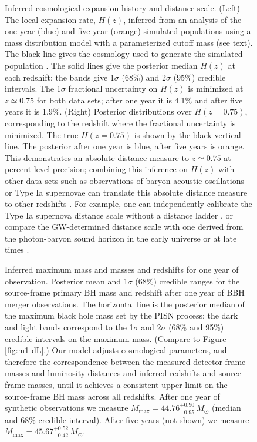 \documentclass[modern]{aastex62}
\newcommand{\MMax}{M_\mathrm{max}}
\newcommand{\MMaxOneYear}{44.76^{+0.90}_{-0.95} \, \MSun{}}
\newcommand{\MMaxFiveYear}{45.67^{+0.52}_{-0.42} \, \MSun{}}
\newcommand{\SigmaHPvtOneYear}{4.1\%}
\newcommand{\SigmaHPvtFiveYear}{1.9\%}
\newcommand{\zpivot}{0.75}
\newcommand{\MSun}{M_\odot}
\begin{document}
\begin{figure}
%
  \caption{\label{fig:Hz} Inferred cosmological expansion history and distance
  scale.  (Left) The local expansion rate, $H(z)$, inferred from an analysis of
  the one year (blue) and five year (orange) simulated populations using a mass
  distribution model with a parameterized cutoff mass (see text).  The black
  line gives the cosmology used to generate the simulated population \citep[TT,
  TE, EE + lowP + lensing + ext]{Planck2016}.  The solid lines give the
  posterior median $H(z)$ at each redshift; the bands give 1$\sigma$ (68\%) and
  2$\sigma$ (95\%) credible intervals.  The 1$\sigma$ fractional uncertainty on
  $H(z)$ is minimized at $z \simeq \zpivot{}$ for both data sets; after one year
  it is \SigmaHPvtOneYear{} and after five years it is \SigmaHPvtFiveYear{}.
  (Right) Posterior distributions over $H\left(z = \zpivot{}\right)$,
  corresponding to the redshift where the fractional uncertainty is minimized.
  The true $H\left( z = \zpivot{} \right)$ is shown by the black vertical line.
  The posterior after one year is blue, after five years is orange.  This
  demonstrates an absolute distance measure to $z \simeq \zpivot{}$ at
  percent-level precision; combining this inference on $H(z)$ with other data
  sets such as observations of baryon acoustic oscillations \citep{BOSS2015} or
  Type Ia supernovae \citep{Scolnic2018} can translate this absolute distance
  measure to other redshifts \citep{BOSS2015,Cuesta2015,Feeney2019}. For
  example, one can independently calibrate the Type Ia supernova distance scale
  without a distance ladder \citep{Feeney2019,Scolnic2018}, or compare the
  \ac{GW}-determined distance scale with one derived from the photon-baryon
  sound horizon \citep{Cuesta2015,Aylor2019} in the early universe
  \citep{Planck2016} or at late times \citep{BOSS2015}. }
%
\end{figure}

\begin{figure}
%
  \caption{\label{fig:mass-correction} Inferred maximum mass and masses and
  redshifts for one year of observation.  Posterior mean and 1$\sigma$ (68\%)
  credible ranges for the source-frame primary \ac{BH} mass and redshift after
  one year of \ac{BBH} merger observations.  The horizontal line is the
  posterior median of the maximum black hole mass set by the PISN process; the
  dark and light bands correspond to the 1$\sigma$ and 2$\sigma$ (68\% and 95\%)
  credible intervals on the maximum mass.  (Compare to Figure \ref{fig:m1-dL}.)
  Our model adjusts cosmological parameters, and therefore the correspondence
  between the measured detector-frame masses and luminosity distances and
  inferred redshifts and source-frame masses, until it achieves a consistent
  upper limit on the source-frame \ac{BH} mass across all redshifts.  After one
  year of synthetic observations we measure $\MMax{} = \MMaxOneYear{}$ (median
  and 68\% credible interval).  After five years (not shown) we measure $\MMax{}
  = \MMaxFiveYear{}$.}
%
\end{figure}
\end{document}
